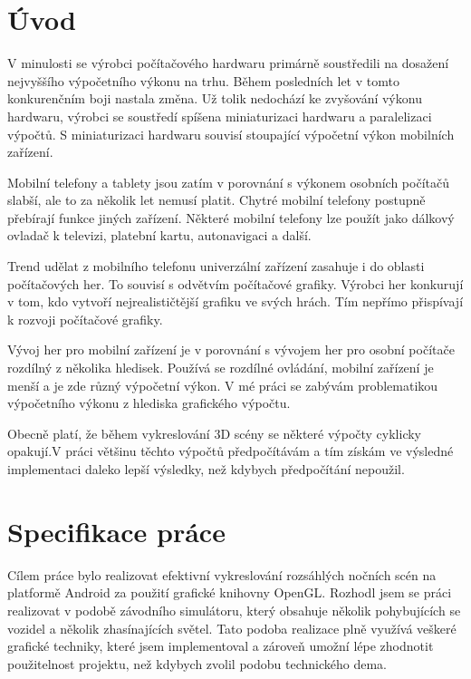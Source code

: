 \documentclass[11pt,twoside,a4paper]{book}
\begin{document}
\chapter{Úvod}
V minulosti se výrobci počítačového hardwaru primárně soustředili na dosažení nejvyššího výpočetního výkonu na trhu. Během posledních let v tomto konkurenčním boji nastala změna. Už tolik nedochází ke zvyšování výkonu hardwaru, výrobci se soustředí spíše\linebreak na miniaturizaci hardwaru a paralelizaci výpočtů. S miniaturizaci hardwaru souvisí stoupající výpočetní výkon mobilních zařízení. 

Mobilní telefony a tablety jsou zatím v porovnání s výkonem osobních počítačů slabší, ale to za několik let nemusí platit. Chytré mobilní telefony postupně přebírají funkce jiných zařízení. Některé mobilní telefony lze použít jako dálkový ovladač k televizi, platební kartu, autonavigaci a další.

Trend udělat z mobilního telefonu univerzální zařízení zasahuje i do oblasti počítačových her. To souvisí s odvětvím počítačové grafiky. Výrobci her konkurují v tom, kdo vytvoří nejrealističtější grafiku ve svých hrách. Tím nepřímo přispívají k rozvoji počítačové grafiky.

Vývoj her pro mobilní zařízení je v porovnání s vývojem her pro osobní počítače rozdílný z několika hledisek. Používá se rozdílné ovládání, mobilní zařízení je menší a je zde různý výpočetní výkon. V mé práci se zabývám problematikou výpočetního výkonu z hlediska grafického výpočtu.

Obecně platí, že během vykreslování 3D scény se některé výpočty cyklicky opakují.\linebreak V práci většinu těchto výpočtů předpočítávám a tím získám ve výsledné implementaci daleko lepší výsledky, než kdybych předpočítání nepoužil.

\chapter{Specifikace práce}
Cílem práce bylo realizovat efektivní vykreslování rozsáhlých nočních scén na platformě Android za použití grafické knihovny OpenGL. Rozhodl jsem se práci realizovat v podobě závodního simulátoru, který obsahuje několik pohybujících se vozidel a několik zhasínajících světel. Tato podoba realizace plně využívá veškeré grafické techniky, které jsem implementoval a zároveň umožní lépe zhodnotit použitelnost projektu, než kdybych zvolil podobu technického dema.
\end{document}
